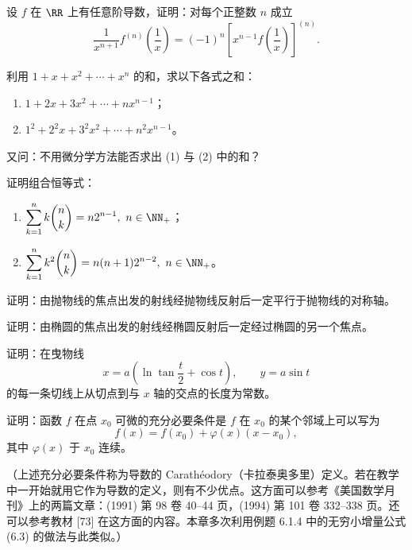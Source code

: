 \begin{xreferenceproblem}[8]
设 $f$ 在 $\RR$ 上有任意阶导数，证明：对每个正整数 $n$ 成立
  \[
    \frac1{x^{n+1}}f^{(n)}\left(\frac1x\right)
    =(-1)^n\left[x^{n-1}f\left(\frac1x\right)\right]^{(n)}.
  \]
\end{xreferenceproblem}

\begin{xreferenceproblem}[9]
利用 $1+x+x^2+\cdots+x^n$ 的和，求以下各式之和：
  \begin{enumerate}[label=(\arabic*)]
    \item $1+2x+3x^2+\cdots+nx^{n-1}$；
    \item $1^2+2^2x+3^2x^2+\cdots+n^2x^{n-1}$。
  \end{enumerate}
  又问：不用微分学方法能否求出 (1) 与 (2) 中的和？
\end{xreferenceproblem}

\begin{xreferenceproblem}[10]
证明组合恒等式：
  \begin{enumerate}[label=(\arabic*)]
    \item $\displaystyle\sum_{k=1}^n k\binom nk=n2^{n-1},\ n\in\NN_+$；
    \item $\displaystyle\sum_{k=1}^n k^2\binom nk=n(n+1)2^{n-2},\ n\in\NN_+$。
  \end{enumerate}
\end{xreferenceproblem}

\begin{xreferenceproblem}[11]
证明：由抛物线的焦点出发的射线经抛物线反射后一定平行于抛物线的对称轴。
\end{xreferenceproblem}

\begin{xreferenceproblem}[12]
证明：由椭圆的焦点出发的射线经椭圆反射后一定经过椭圆的另一个焦点。
\end{xreferenceproblem}

\begin{xreferenceproblem}[13]
证明：在曳物线
  \[
    x=a\left(\ln\tan\frac t2+\cos t\right),\qquad y=a\sin t
  \]
  的每一条切线上从切点到与 $x$ 轴的交点的长度为常数。
\end{xreferenceproblem}

\begin{xreferenceproblem}[14]
证明：函数 $f$ 在点 $x_0$ 可微的充分必要条件是 $f$ 在 $x_0$ 的某个邻域上可以写为
  \[
    f(x)=f(x_0)+\varphi(x)(x-x_0),
  \]
  其中 $\varphi(x)$ 于 $x_0$ 连续。

  （上述充分必要条件称为导数的 Carathéodory（卡拉泰奥多里）定义。若在教学中一开始就用它作为导数的定义，则有不少优点。这方面可以参考《美国数学月刊》上的两篇文章：(1991) 第 98 卷 40--44 页，(1994) 第 101 卷 332--338 页。还可以参考教材 [73] 在这方面的内容。本章多次利用例题 6.1.4 中的无穷小增量公式 (6.3) 的做法与此类似。）
\end{xreferenceproblem}

